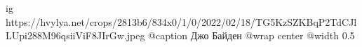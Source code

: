  
 
 
 
 

\ifcmt
  ig https://hvylya.net/crops/2813b6/834x0/1/0/2022/02/18/TG5KzSZKBqP2TdCJlLUpi288M96qsiiViF8JIrGw.jpeg
  @caption Джо Байден
  @wrap center
  @width 0.5
\fi
